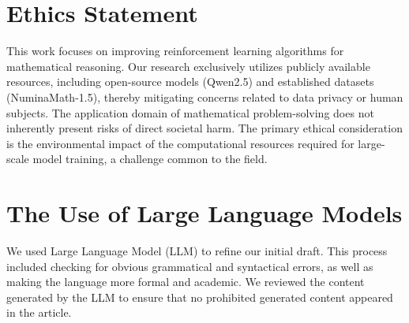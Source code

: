 \section{Ethics Statement}

This work focuses on improving reinforcement learning algorithms for mathematical reasoning. Our research exclusively utilizes publicly available resources, including open-source models (Qwen2.5) and established datasets (NuminaMath-1.5), thereby mitigating concerns related to data privacy or human subjects. The application domain of mathematical problem-solving does not inherently present risks of direct societal harm. The primary ethical consideration is the environmental impact of the computational resources required for large-scale model training, a challenge common to the field.

\section{The Use of Large Language Models}

We used Large Language Model (LLM) to refine our initial draft. This process included checking for obvious grammatical and syntactical errors, as well as making the language more formal and academic. We reviewed the content generated by the LLM to ensure that no prohibited generated content appeared in the article.

